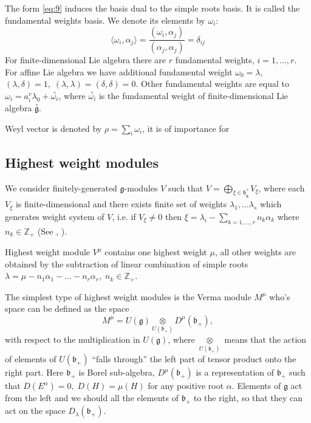 \documentclass[preprint,12pt]{elsarticle}
\newcommand{\go}{\stackrel{\circ }{\mathfrak{g}}}
\newcommand{\co}[1]{\stackrel{\circ }{#1}}
\newcommand{\gf}{\mathfrak{g}}
\newcommand{\bff}{\mathfrak{b}}
\newcommand{\hf}{\mathfrak{h}}
\newcommand{\hfg}{\hf_{\gf}}
\begin{document}
The form \eqref{eq:9} induces the basis dual  to the simple
roots basis. It is called the fundamental weights basis. We denote
its elements by $\omega_i$:
\begin{equation}
  \label{eq:20}
  \langle\omega_i,\alpha_j\rangle=\frac{(\omega_{i},\alpha_{j})}{(\alpha_{j},\alpha_{j})}=\delta_{ij}
\end{equation}
For finite-dimensional Lie algebra there are $r$ fundamental weights, $i=1,\dots, r$. For affine Lie algebra we have additional fundamental weight $\omega_0=\lambda$, $(\lambda,\delta)=1, \; (\lambda,\lambda)=(\delta,\delta)=0$. Other fundamental weights are equal to $\omega_i=a_i^v \lambda_0 +\co{\omega_i}$, where $\co{\omega_i}$ is the fundamental weight of finite-dimensional Lie algebra $\go$.

Weyl vector is denoted by $\rho=\sum_{i} \omega_{i}$, it is of importance for 
\subsection{Highest weight modules}
\label{sec:high-weight-modul}

We consider finitely-generated $\gf$-modules $V$ such that $V=\bigoplus_{\xi\in \hfg^{*}} V_{\xi}$, where each $V_{\xi}$ is finite-dimensional and there exists finite set of weights $\lambda_{1},\dots \lambda_{s}$ which generates weight system of $V$, i.e. if $V_{\xi}\neq 0$ then $\xi=\lambda_{i}-\sum_{k=1,\dots, r} n_{k}\alpha_{k}$ where $n_{k}\in \mathbb{Z}_{+}$ (See \cite{humphreys2008representations}, \cite{carter2005lie}).

Highest weight module $V^{\mu}$ contains one highest weight $\mu$, all other weights are obtained by the subtraction of linear combination of simple roots $\lambda=\mu-n_{1}\alpha_{1}-\dots-n_{r}\alpha_{r},\; n_{k}\in \mathbb{Z}_{+}$. 

The simplest type of highest weight modules is the Verma module
$M^{\mu}$ who's space can be defined as the space
\begin{equation}
  \label{eq:17}
  M^{\mu}=U(\gf)\underset{U(\bff_{+})}{\otimes} D^{\mu}(\bff_{+}),
\end{equation}
with respect to the multiplication in $U(\gf)$, 
where $\underset{U(\bff_{+})}{\otimes}$ means that the action of elements of $U(\bff_{+})$ ``falls through'' the left part of tensor product onto the right part. Here $\bff_{+}$ is Borel sub-algebra, $D^{\mu}(\bff_{+})$ is a representation of $\bff_{+}$ such that $D(E^{\alpha})=0,\; D(H)=\mu(H)$ for any positive root $\alpha$.
Elements of $\gf$ act from the left and we should all the elements of $\bff_{+}$ to the right, so that they can act on the space $D_{\lambda}(\bff_{+})$.
\end{document}
